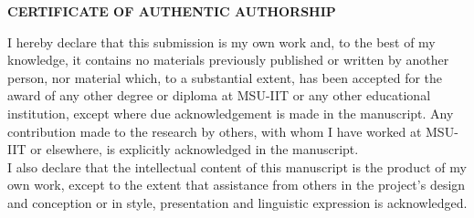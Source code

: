 
\cleardoublepage{}
{\baselineskip

\begin{center}
{\bf CERTIFICATE OF AUTHENTIC AUTHORSHIP}\\[36pt]
\end{center}

I hereby declare that this submission is my own work and, to the best of my knowledge, it contains no materials previously published or written by another person, nor material which, to a substantial extent, has been accepted for the award of any other degree or diploma at MSU-IIT or any other educational institution, except where due acknowledgement is made in the manuscript. Any contribution made to the research by others, with whom I have worked at MSU-IIT or elsewhere, is explicitly acknowledged in the manuscript.\\

I also declare that the intellectual content of this manuscript is the product of my own work, except to the extent that assistance from others in the project's design and conception or in style, presentation and linguistic expression is acknowledged.\\[12pt]


}